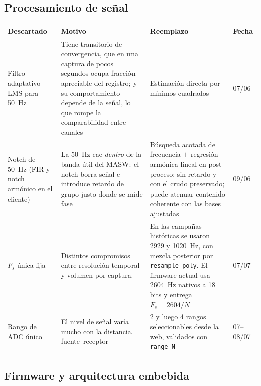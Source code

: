 \subsection{Procesamiento de se\~nal}

\begin{center}\footnotesize
\begin{tabularx}{\textwidth}{@{}l X X l@{}}
\toprule
\textbf{Descartado} & \textbf{Motivo} & \textbf{Reemplazo} & \textbf{Fecha} \\
\midrule
Filtro adaptativo LMS para \SI{50}{\hertz}
& Tiene transitorio de convergencia, que en una captura de pocos segundos ocupa fracci\'on apreciable del registro; y su comportamiento depende de la se\~nal, lo que rompe la comparabilidad entre canales
& Estimaci\'on directa por m\'inimos cuadrados
& 07/06 \\
\addlinespace[2pt]
Notch de \SI{50}{\hertz} (FIR y notch arm\'onico en el cliente)
& La \SI{50}{\hertz} cae \emph{dentro} de la banda \'util del MASW: el notch borra se\~nal e introduce retardo de grupo justo donde se mide fase
& B\'usqueda acotada de frecuencia $+$ regresi\'on arm\'onica lineal en post-proceso: sin retardo y con el crudo preservado; puede atenuar contenido coherente con las bases ajustadas
& 09/06 \\
\addlinespace[2pt]
$F_s$ \'unica fija
& Distintos compromisos entre resoluci\'on temporal y volumen por captura
& En las campa\~nas hist\'oricas se usaron $2929$ y \SI{1020}{\hertz}, con mezcla posterior por \texttt{resample\_poly}. El firmware actual usa \SI{2604}{\hertz} nativos a 18 bits y entrega $F_s=2604/N$
& 07/07 \\
\addlinespace[2pt]
Rango de ADC \'unico
& El nivel de se\~nal var\'ia mucho con la distancia fuente--receptor
& 2 y luego 4 rangos seleccionables desde la web, validados con \texttt{range N}
& 07--08/07 \\
\bottomrule
\end{tabularx}
\end{center}

\subsection{Firmware y arquitectura embebida}

